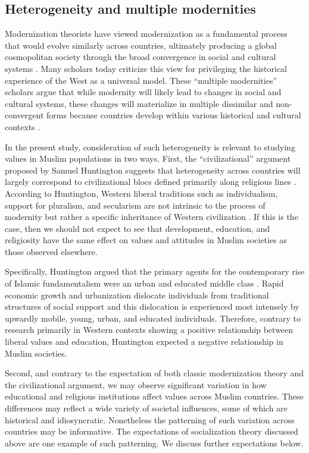 \documentclass[10pt,letterpaper]{article}
\begin{document}
\subsection*{Heterogeneity and multiple modernities}

Modernization theorists have viewed modernization as a fundamental
process that would evolve similarly across countries, ultimately
producing a global cosmopolitan society through the broad convergence in
social and cultural systems \cite{fukuyama_end_1992}. Many scholars
today criticize this view for privileging the historical experience of
the West as a universal model. These ``multiple modernities'' scholars
argue that while modernity will likely lead to changes in social and
cultural systems, these changes will materialize in multiple dissimilar
and non-convergent forms because countries develop within various
historical and cultural contexts
\cite{hefner_multiple_1998, eisenstadt_multiple_2000, kamali_multiple_2006, casanova_cosmopolitanism_2011}.

In the present study, consideration of such heterogeneity is relevant to
studying values in Muslim populations in two ways. First, the
``civilizational'' argument proposed by Samuel Huntington
suggests that heterogeneity across countries will largely correspond to
civilizational blocs defined primarily along religious lines \cite{huntington_clash_1996}. According
to Huntington, Western liberal traditions such as individualism, support
for pluralism, and secularism are not intrinsic to the process of
modernity but rather a specific inheritance of Western civilization
\cite{huntington_clash_1996}. If this is the case, then
we should not expect to see that development, education, and religiosity
have the same effect on values and attitudes in Muslim societies as
those observed elsewhere.

Specifically, Huntington argued that the primary agents for the
contemporary rise of Islamic fundamentalism were an urban and educated
middle class \cite{huntington_clash_1996}. Rapid economic
growth and urbanization dislocate individuals from traditional
structures of social support and this dislocation is experienced most
intensely by upwardly mobile, young, urban, and educated individuals.
Therefore, contrary to research primarily in Western contexts showing a
positive relationship between liberal values and education, Huntington
expected a negative relationship in Muslim societies.

Second, and contrary to the expectation of both classic modernization
theory and the civilizational argument, we may observe significant
variation in how educational and religious institutions affect values
across Muslim countries. These differences may reflect a wide variety of
societal influences, some of which are historical and idiosyncratic.
Nonetheless the patterning of such variation across countries may be
informative. The expectations of socialization theory discussed above
are one example of such patterning. We discuss further expectations
below.
\end{document}

